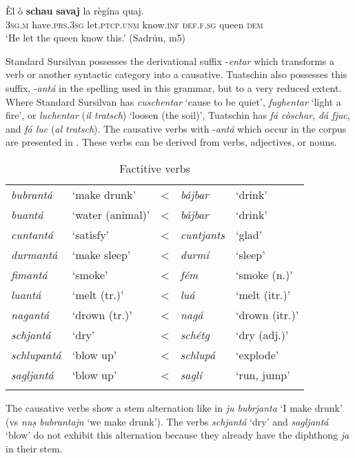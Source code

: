 \ea
\label{ex:causscha2}
\gll    Èl ò \textbf{schau} \textbf{savaj} la règína quaj.\\
\textsc{3sg.m} have.\textsc{prs.3sg} let.\textsc{ptcp.unm} know.\textsc{inf} \textsc{def.f.sg} queen \textsc{dem}\\
\glt `He let the queen know this.' (Sadrún, m5)
\z

Standard Sursilvan possesses the derivational suffix -\textit{entar} which transforms a verb or another syntactic category into a causative. Tuatschin also possesses this suffix, -\textit{antá} in the spelling used in this grammar, but to a very reduced extent. Where Standard Sursilvan has \textit{cuschentar} `cause to be quiet', \textit{fughentar} `light a fire', or \textit{luchentar} (\textit{il tratsch}) `loosen (the soil)', Tuatschin has \textit{fá còschar}, \textit{dá fjuc}, and \textit{fá luc} (\textit{al tratsch}). The causative verbs with -\textit{antá} which occur in the corpus are presented in . These verbs can be derived from verbs, adjectives, or nouns.

\begin{table}
	\caption{Factitive verbs}
	\label{factanta}
	\begin{tabular}{lllll}
		\lsptoprule
		\textit{bubrantá} &`make drunk' & < & \textit{bájbar} & `drink'\\
		\textit{buantá} & `water (animal)' & < & \textit{bájbar} & `drink'\\
		\textit{cuntantá} &`satisfy' & < & \textit{cuntjants} & `glad'\\
		\textit{durmantá} & `make sleep' & < & \textit{durmí} & `sleep'\\
		\textit{fimantá} &`smoke' & < & \textit{fém} & `smoke (n.)'\\
		\textit{luantá}	&`melt (tr.)' & < &\textit{luá} & `melt (itr.)'\\
		\textit{nagantá}	&`drown (tr.)' & < & \textit{nagá} & `drown (itr.)'\\
		\textit{schjantá} & `dry' & < & \textit{schétg} & `dry (adj.)'\\
		\textit{schlupantá} & `blow up'&	< & \textit{schlupá} & `explode'\\
		\textit{sagljantá} & `blow up' & < & \textit{saglí} & `run, jump'\\
		
		\lspbottomrule
	\end{tabular}
\end{table}

The causative verbs show a stem alternation like in \textit{ju bubrjanta} `I make drunk' (vs \textit{nuṣ bubrantajn} `we make drunk'). The verbs \textit{schjantá} `dry' and \textit{sagljantá} `blow' do not exhibit this alternation because they already have the diphthong \textit{ja} in their stem.

